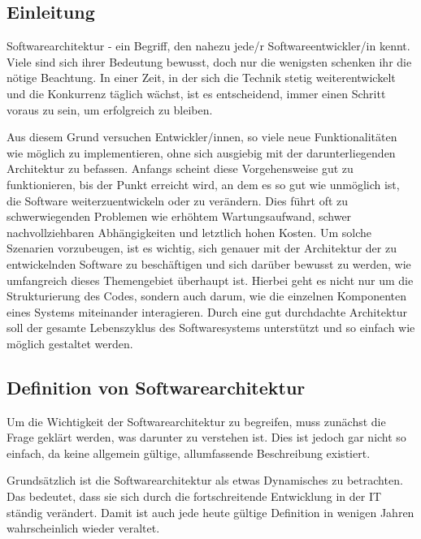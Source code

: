 
\subsection{Einleitung}

Softwarearchitektur - ein Begriff, den nahezu jede/r Softwareentwickler/in kennt.
Viele sind sich ihrer Bedeutung bewusst, doch nur die wenigsten schenken ihr die nötige Beachtung.
In einer Zeit, in der sich die Technik stetig weiterentwickelt und die Konkurrenz täglich wächst, ist es entscheidend, immer einen Schritt voraus zu sein, um erfolgreich zu bleiben.

Aus diesem Grund versuchen Entwickler/innen, so viele neue Funktionalitäten wie möglich zu implementieren, ohne sich ausgiebig mit der darunterliegenden Architektur zu befassen.
Anfangs scheint diese Vorgehensweise gut zu funktionieren, bis der Punkt erreicht wird, an dem es so gut wie unmöglich ist, die Software weiterzuentwickeln oder zu verändern. Dies führt oft zu schwerwiegenden Problemen wie erhöhtem Wartungsaufwand, schwer nachvollziehbaren Abhängigkeiten und letztlich hohen Kosten.
Um solche Szenarien vorzubeugen, ist es wichtig, sich genauer mit der Architektur der zu entwickelnden Software zu beschäftigen und sich darüber bewusst zu werden, wie umfangreich dieses Themengebiet überhaupt ist.
Hierbei geht es nicht nur um die Strukturierung des Codes, sondern auch darum, wie die einzelnen Komponenten eines Systems miteinander interagieren. Durch eine gut durchdachte Architektur soll der gesamte Lebenszyklus des Softwaresystems unterstützt und so einfach wie möglich gestaltet werden. 
\cite[S. 10, S. 136-137]{EA:Book01}



\subsection{Definition von Softwarearchitektur}

Um die Wichtigkeit der Softwarearchitektur zu begreifen, muss zunächst die Frage geklärt werden, was darunter zu verstehen ist. Dies ist jedoch gar nicht so einfach, da keine allgemein gültige, allumfassende Beschreibung existiert.

Grundsätzlich ist die Softwarearchitektur als etwas Dynamisches zu betrachten. Das bedeutet, dass sie sich durch die fortschreitende Entwicklung in der IT ständig verändert. Damit ist auch jede heute gültige Definition in wenigen Jahren wahrscheinlich wieder veraltet. \cite[S. 1-3]{EA:Book02}

